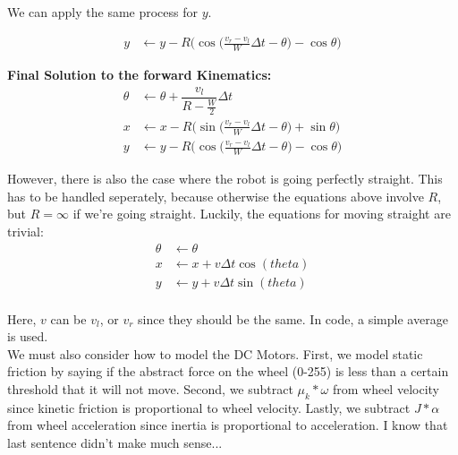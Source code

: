 \documentclass{article}
\begin{document}
We can apply the same process for $y$.

\begin{align}
  y &\leftarrow y-R\Bigg(\cos{\Big(\frac{v_r-v_l}{W}\Delta t-\theta\Big)}-\cos{\theta}\Bigg)
\end{align}

\textbf{Final Solution to the forward Kinematics:}
\begin{align}
 \theta &\leftarrow \theta + \dfrac{v_l}{R-\frac{W}{2}}\Delta t \\
  x &\leftarrow x-R\Bigg(\sin{\Big(\frac{v_r-v_l}{W}\Delta t-\theta\Big)}+\sin{\theta}\Bigg) \\
  y &\leftarrow y-R\Bigg(\cos{\Big(\frac{v_r-v_l}{W}\Delta t-\theta\Big)}-\cos{\theta}\Bigg)
\end{align}

However, there is also the case where the robot is going perfectly straight. This has to be handled seperately, because otherwise the equations above involve $R$, but $R=\infty$ if we're going straight. Luckily, the equations for moving straight are trivial:
\begin{align}
 \theta &\leftarrow \theta \\
  x &\leftarrow x + v\Delta t\cos(theta) \\
  y &\leftarrow y + v\Delta t\sin(theta) \\
\end{align}

Here, $v$ can be $v_l$, or $v_r$ since they should be the same. In code, a simple average is used. \\

We must also consider how to model the DC Motors. First, we model static friction by saying if the abstract force on the wheel (0-255) is less than a certain threshold that it will not move. Second, we subtract $\mu_k * \omega$ from wheel velocity since kinetic friction is proportional to wheel velocity. Lastly, we subtract $J * \alpha$ from wheel acceleration since inertia is proportional to acceleration. I know that last sentence didn't make much sense...
\end{document}
